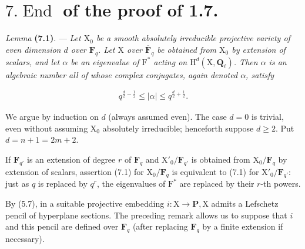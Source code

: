 \documentclass[10pt,leqno]{article}
\begin{document}
\section*{\(7. \operatorname{End}\) of the proof of 1.7.}

\noindent \emph{Lemma} \textbf{(7.1)}. — {\itshape Let \(\mathrm{X}_{0}\) be a smooth absolutely irreducible projective variety of \textup{even} dimension \(d\) over \(\mathbf{F}_{q}\). Let \(\mathrm{X}\) over \(\overline{\mathbf{F}}_{q}\) be obtained from \(\mathrm{X}_{0}\) by extension of scalars, and let \(\alpha \) be an eigenvalue of \(\mathrm{F}^{*}\) acting on \(\mathrm{H}^{d}(\mathrm{X},\mathbf{Q}_{\ell })\). Then \(\alpha \) is an algebraic number all of whose complex conjugates, again denoted \(\alpha \), satisfy}\par

\begin{equation*}\begin{gathered}q^{\frac{d}{2}- \frac{1}{2}} \leq  |\alpha | \leq  q^{\frac{d}{2}+\frac{1}{2}}.\end{gathered}\tag{7.1.1}\end{equation*}

\noindent We argue by induction on \(d\) (always assumed even). The case \(d=0\) is trivial, even without assuming \(\mathrm{X}_{0}\) absolutely irreducible; henceforth suppose \(d\geq 2\). Put \(d=n+1=2m+2\).\par

\clearpage

\label{physical-28}\par\smallskip

\noindent If \(\mathbf{F}_{q'}\) is an extension of degree \(r\) of \(\mathbf{F}_{q}\) and \(\mathrm{X}'_{0}/\mathbf{F}_{q'}\) is obtained from \(\mathrm{X}_{0}/\mathbf{F}_{q}\) by extension of scalars, assertion (7.1) for \(\mathrm{X}_{0}/\mathbf{F}_{q}\) is equivalent to (7.1) for \(\mathrm{X}'_{0}/\mathbf{F}_{q'}\): just as \(q\) is replaced by \(q^{r}\), the eigenvalues of \(\mathrm{F}^{*}\) are replaced by their \(r\)-th powers.\par

\noindent By (5.7), in a suitable projective embedding \(i:\mathrm{X}\longrightarrow \mathbf{P}, \mathrm{X}\) admits a Lefschetz pencil of hyperplane sections. The preceding remark allows us to suppose that \(i\) and this pencil are defined over \(\mathbf{F}_{q}\) (after replacing \(\mathbf{F}_{q}\) by a finite extension if necessary).\par
\end{document}

